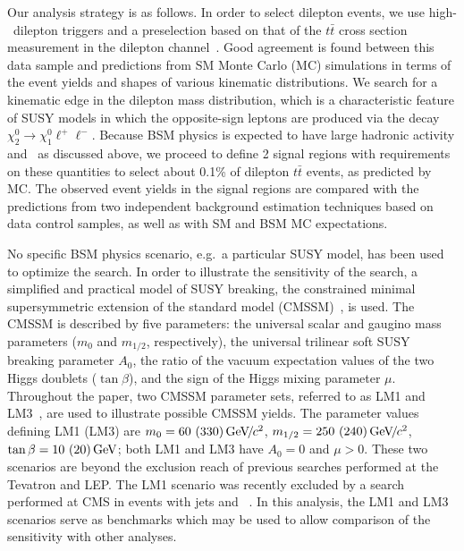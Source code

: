 Our analysis strategy is as follows. In order to select dilepton events, we
use high-\pt\ dilepton triggers and a preselection based 
on that of the $t\bar{t}$ cross section measurement in the dilepton channel~\cite{ref:top}.
Good agreement is found between this
data sample and predictions from SM Monte Carlo (MC) simulations in terms of the event yields
and shapes of various kinematic distributions. 
We search for a kinematic edge in the dilepton mass distribution, which is a characteristic
feature of SUSY models in which the opposite-sign leptons are produced via the decay 
$\chi_2^0 \to \chi_1^0 \ell^+\ell^-$.
Because BSM physics is expected to have large hadronic activity and \MET\ as discussed
above, we  proceed to define 2 signal regions
with requirements on these quantities to select about 0.1\% 
of dilepton $t\bar{t}$ events, as predicted by MC.
The observed event yields in the signal regions are compared with the predictions from two 
independent background estimation techniques based on data control samples, 
as well as with SM and BSM MC expectations.

No specific BSM physics scenario, e.g.\ a particular SUSY model, has been used to optimize the search.
In order to illustrate the sensitivity of the search, a simplified and practical model of 
SUSY breaking, the constrained minimal supersymmetric
extension of the standard model (CMSSM)~\cite{CMSSM,CMSSM2}, is used. The CMSSM is described by
five parameters: the universal scalar and gaugino mass parameters ($m_0$ and $m_{1/2}$, respectively),
the universal trilinear soft SUSY breaking parameter $A_0$, the
ratio of the vacuum expectation values of the two Higgs doublets ($\tan\beta$), and the sign of the
Higgs mixing parameter $\mu$. 
Throughout the paper, two CMSSM parameter sets, referred
to as LM1 and LM3~\cite{TDR}, are used to illustrate possible CMSSM yields. The parameter values
defining LM1 (LM3) are $m_0 = 60~(330) {\,\text{Ge\hspace{-.08em}V\hspace{-0.16em}/\hspace{-0.08em}}c^\text{2}}$, $m_{1/2} = 250~(240) {\,\text{Ge\hspace{-.08em}V\hspace{-0.16em}/\hspace{-0.08em}}c^\text{2}}$, $\tan\beta = 10~(20)\,\text{Ge\hspace{-.08em}V}$; 
both LM1 and LM3 have $A_0 = 0$ and $\mu > 0$.  These two scenarios are beyond the exclusion reach 
of previous searches performed at the Tevatron and LEP. The LM1 scenario was recently excluded 
by a search performed at CMS in events with jets and \MET~\cite{ref:RA1}. 
In this analysis, the LM1 and LM3 scenarios serve as benchmarks which 
may be used to allow comparison of the sensitivity with other analyses.


